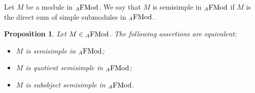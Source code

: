 \documentclass[12pt]{amsart}
\newtheorem{prop}[thm]{Proposition}
\theoremstyle{definition}
\newcommand{\FMod}{{\rm FMod}}
\begin{document}
Let $M$ be a module in ${}_A \FMod$.
We say that $M$ is semisimple 
in ${}_A\FMod$
if $M$ is the direct sum of simple 
submodules in ${}_A\FMod$.

\begin{prop}\label{prop:semisimpleequiv}
Let $M \in {}_A \FMod$. 
The following assertions are equivalent:
\begin{itemize}[widest=(iii)]

\item[{\rm (i)}] $M$ is semisimple 
in ${}_A\FMod$;

\item[{\rm (ii)}] $M$ is quotient semisimple
in ${}_A\FMod$;

\item[{\rm (iii)}] $M$ is subobject 
semisimple in ${}_A\FMod$.

\end{itemize}
\end{prop}
\end{document}
